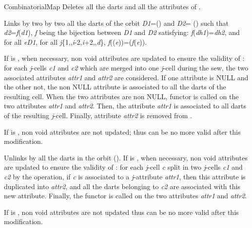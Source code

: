 \begin{ccRefConcept}{CombinatorialMap}
   {Deletes all the darts and all the attributes of .}
\ccOperations

 {Links by \betai{}
  two by two all the darts of the orbit
  \emph{D1}=\orbit{\betaun{},\myldots{},\betaimdeux{},\betaipdeux{},\myldots{},\betad{}}() and
  \emph{D2}=\orbit{\betazero{},\betadeux{},\myldots{},\betaimdeux{},\betaipdeux{},\myldots{},\betad{}}	()
  such that \emph{d2}=\emph{f}(\emph{d1}), \emph{f} being the bijection between \emph{D1} and \emph{D2} 
  satisfying: \emph{f}(\emph{dh1})=\emph{dh2}, and for all \emph{e}\myin{}\emph{D1}, for all 
  \emph{j}\myin{}\{1,\myldots{},\emph{i}-2,\emph{i}+2,\myldots{},\emph{d}\},
  \emph{f}(\betaj{}(\emph{e}))=\betajinv{}(\emph{f}(\emph{e})).

  If  is , when necessary, non void
  attributes are updated to ensure the validity of : for each
  \emph{j}-cells \emph{c1} and \emph{c2} which are merged into one \emph{j}-cell during
  the sew, the two associated attributes \emph{attr1} and \emph{attr2} are
  considered.  If one attribute is
  NULL and the other not, the non NULL attribute is associated to all
  the darts of the resulting cell.  When the two attributes are non
  NULL, functor  is called on
  the two attributes \emph{attr1} and \emph{attr2}. Then, the attribute
  \emph{attr1} is associated to all darts of the resulting
  \emph{j}-cell. Finally, attribute \emph{attr2} is removed from .
  \begin{ccAdvanced}
    If  is , non void attributes are
    not updated; thus  can be no more valid after this
    modification.
  \end{ccAdvanced}
}

 {Unlinks by \betai{} all the darts in the
  orbit
  \orbit{\betaun{},\myldots{},\betaimdeux{},\betaipdeux{},\myldots{},\betad{}}().  If
   is , when necessary, non void
  attributes are updated to ensure the validity of : for each
  \emph{j}-cell \emph{c} split in two \emph{j}-cells \emph{c1} and \emph{c2} by the
  operation, if \emph{c} is associated to a \emph{j}-attribute \emph{attr1}, then
  this attribute is duplicated into \emph{attr2}, and all the darts
  belonging to \emph{c2} are associated with this new attribute.  Finally,
  the functor  is called on the
  two attributes \emph{attr1} and \emph{attr2}.
\begin{ccAdvanced}
  If  is , non void attributes are
  not updated thus  can be no more valid after this
  modification. 
\end{ccAdvanced}}


\end{ccRefConcept}
